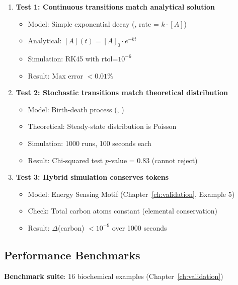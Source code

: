 \begin{enumerate}
    \item \textbf{Test 1: Continuous transitions match analytical solution}
    \begin{itemize}
        \item Model: Simple exponential decay (, rate = $k \cdot [A]$)
        \item Analytical: $[A](t) = [A]_0 \cdot e^{-kt}$
        \item Simulation: RK45 with rtol=$10^{-6}$
        \item Result: Max error $< 0.01\%$ \checkmark
    \end{itemize}
    
    \item \textbf{Test 2: Stochastic transitions match theoretical distribution}
    \begin{itemize}
        \item Model: Birth-death process (, )
        \item Theoretical: Steady-state distribution is Poisson
        \item Simulation: 1000 runs, 100 seconds each
        \item Result: Chi-squared test $p$-value = 0.83 (cannot reject) \checkmark
    \end{itemize}
    
    \item \textbf{Test 3: Hybrid simulation conserves tokens}
    \begin{itemize}
        \item Model: Energy Sensing Motif (Chapter~\ref{ch:validation}, Example 5)
        \item Check: Total carbon atoms constant (elemental conservation)
        \item Result: $\Delta$(carbon) $< 10^{-9}$ over 1000 seconds \checkmark
    \end{itemize}
\end{enumerate}

\subsection{Performance Benchmarks}
\label{subsec:performance-benchmarks}

\textbf{Benchmark suite}: 16 biochemical examples (Chapter~\ref{ch:validation})

